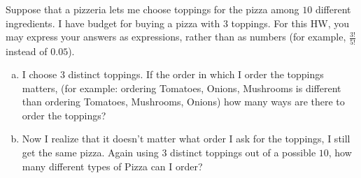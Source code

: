 \documentclass[]{article}
\newif\ifsolutions
\renewcommand{\answer}[1]{{\color{mydarkblue}\textbf{Solution:}#1}}
\begin{document}
\begin{qunlist}
\begin{enumerate}[a)]

\end{enumerate}




Suppose that a pizzeria lets me choose toppings for the pizza among $10$ different ingredients. I have budget for buying a pizza with $3$ toppings. For this HW, you may express your answers as expressions, rather than as numbers (for example, $\frac{3!}{5!}$ instead of $0.05$).

\begin{enumerate}[a)]
  \qpart 
\item I choose $3$ distinct toppings. If the order in which I order the toppings matters, (for example: ordering Tomatoes, Onions, Mushrooms is different than ordering Tomatoes, Mushrooms, Onions) how many ways are there to order the toppings?

\ifsolutions{ \answer { $10*9*8 = 720$. Because we are sampling without replacement, there are $10*9*8$ different ways to order the toppings. There are $10$ different things to order first, $9$ different things to order second (we can't order the same thing twice) and $8$ things to order third (remember that we can order the first or second topping again).  \\ {\bf Problem Elaboration: } Consider the generalization of this problem, if could order $k$ toppings ($k \leq n$), we would have $\frac{n!}{(n-k)!}$ possible orders. If we were allowed to order the same topping multiple times we would have $10^k$ different orders (since there would always be $10$ choices for the first, second, third, etc. topping).

}}\fi
  
  \qpart
\item Now I realize that it doesn't matter what order I ask for the toppings, I still get the same pizza. Again using $3$ distinct toppings out of a possible $10$, how many different types of Pizza can I order?


\end{enumerate}
\end{qunlist}
\end{document}
